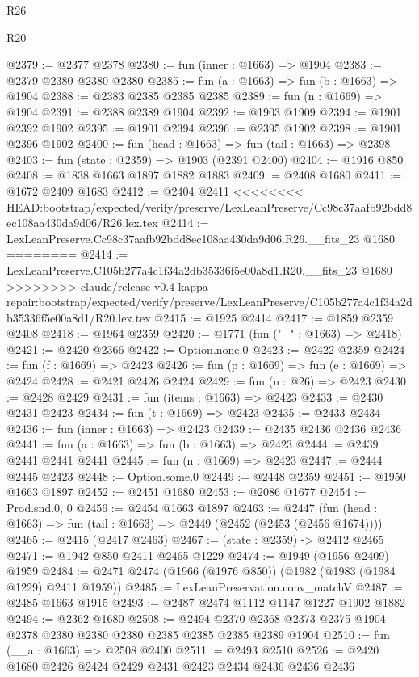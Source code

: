 \begin{lexlean}{R26}
\begin{lexlean}{R20}
\begin{coremodule}
{{{{{{{{{{{{{{{{{{{{{{{{{{{{{{{{{{{{{{{{{{{{{{{{{{{{{{{{{{{{{{{@2379 := @2377 @2378
@2380 := fun (inner : @1663) => @1904
@2383 := @2379 @2380 @2380 @2380
@2385 := fun (a : @1663) => fun (b : @1663) => @1904
@2388 := @2383 @2385 @2385 @2385
@2389 := fun (n : @1669) => @1904
@2391 := @2388 @2389 @1904
@2392 := @1903 @1909
@2394 := @1901 @2392 @1902
@2395 := @1901 @2394
@2396 := @2395 @1902
@2398 := @1901 @2396 @1902
@2400 := fun (head : @1663) => fun (tail : @1663) => @2398
@2403 := fun (state : @2359) => @1903 (@2391 @2400)
@2404 := @1916 @850
@2408 := @1838 @1663 @1897 @1882 @1883
@2409 := @2408 @1680
@2411 := @1672 @2409 @1683
@2412 := @2404 @2411
<<<<<<<< HEAD:bootstrap/expected/verify/preserve/LexLeanPreserve/Cc98c37aafb92bdd8ec108aa430da9d06/R26.lex.tex
@2414 := LexLeanPreserve.Cc98c37aafb92bdd8ec108aa430da9d06.R26.__fits_23 @1680
========
@2414 := LexLeanPreserve.C105b277a4c1f34a2db35336f5e00a8d1.R20.__fits_23 @1680
>>>>>>>> claude/release-v0.4-kappa-repair:bootstrap/expected/verify/preserve/LexLeanPreserve/C105b277a4c1f34a2db35336f5e00a8d1/R20.lex.tex
@2415 := @1925 @2414
@2417 := @1859 @2359 @2408
@2418 := @1964 @2359
@2420 := @1771 (fun ("_" : @1663) => @2418)
@2421 := @2420 @2366
@2422 := Option.none.{0}
@2423 := @2422 @2359
@2424 := fun (f : @1669) => @2423
@2426 := fun (p : @1669) => fun (e : @1669) => @2424
@2428 := @2421 @2426 @2424
@2429 := fun (n : @26) => @2423
@2430 := @2428 @2429
@2431 := fun (items : @1663) => @2423
@2433 := @2430 @2431 @2423
@2434 := fun (t : @1669) => @2423
@2435 := @2433 @2434
@2436 := fun (inner : @1663) => @2423
@2439 := @2435 @2436 @2436 @2436
@2441 := fun (a : @1663) => fun (b : @1663) => @2423
@2444 := @2439 @2441 @2441 @2441
@2445 := fun (n : @1669) => @2423
@2447 := @2444 @2445 @2423
@2448 := Option.some.{0}
@2449 := @2448 @2359
@2451 := @1950 @1663 @1897
@2452 := @2451 @1680
@2453 := @2086 @1677
@2454 := Prod.snd.{0, 0}
@2456 := @2454 @1663 @1897
@2463 := @2447 (fun (head : @1663) => fun (tail : @1663) => @2449 (@2452 (@2453 (@2456 @1674))))
@2465 := @2415 (@2417 @2463)
@2467 := (state : @2359) -> @2412 @2465
@2471 := @1942 @850 @2411 @2465 @1229
@2474 := @1949 (@1956 @2409) @1959
@2484 := @2471 @2474 (@1966 (@1976 @850)) (@1982 (@1983 (@1984 @1229) @2411 @1959))
@2485 := LexLeanPreservation.conv_matchV
@2487 := @2485 @1663 @1915
@2493 := @2487 @2474 @1112 @1147 @1227 @1902 @1882
@2494 := @2362 @1680
@2508 := @2494 @2370 @2368 @2373 @2375 @1904 @2378 @2380 @2380 @2380 @2385 @2385 @2385 @2389 @1904
@2510 := fun (__a : @1663) => @2508 @2400
@2511 := @2493 @2510
@2526 := @2420
    @1680
    @2426
    @2424
    @2429
    @2431
    @2423
    @2434
    @2436
    @2436
    @2436
}}}}}}}}}}}}}}}}}}}}}}}}}}}}}}}}}}}}}}}}}}}}}}}}}}}}}}}}}}}}}}}
\end{coremodule}
\end{lexlean}
\end{lexlean}
